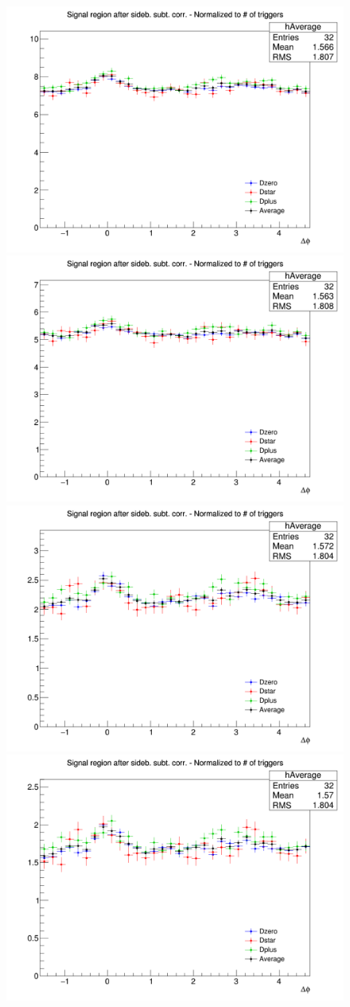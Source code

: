 \begin{figure}[!htbp]
\centering
{\includegraphics[width=0.48\linewidth]{figures/Averages/AzimCorrDistr_Canvas_PtIntBins3to5_PoolInt_thrdot3to99dot_Superimp.png}}
{\includegraphics[width=0.48\linewidth]{figures/Averages/AzimCorrDistr_Canvas_PtIntBins3to5_PoolInt_thrdot3to1dot_Superimp.png}}
{\includegraphics[width=0.48\linewidth]{figures/Averages/AzimCorrDistr_Canvas_PtIntBins3to5_PoolInt_thr1dotto99dot_Superimp.png}}
{\includegraphics[width=0.48\linewidth]{figures/Averages/AzimCorrDistr_Canvas_PtIntBins3to5_PoolInt_thr1dotto2dot_Superimp.png}}

\end{figure}
